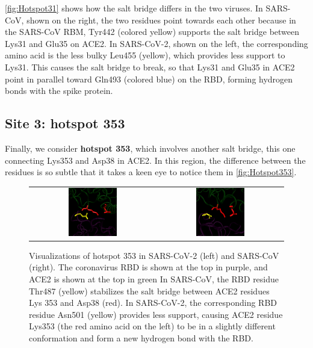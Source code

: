 \autoref{fig:Hotspot31} shows how the salt bridge differs in the two viruses. In SARS-CoV, shown on the right, the two residues point towards each other because in the SARS-CoV RBM, Tyr442 (colored yellow) supports the salt bridge between Lys31 and Glu35 on ACE2. In SARS-CoV-2, shown on the left, the corresponding amino acid is the less bulky Leu455 (yellow), which provides less support to Lys31. This causes the salt bridge to break, so that Lys31 and Glu35 in ACE2 point in parallel toward Gln493 (colored blue) on the RBD, forming hydrogen bonds with the spike protein.

\FloatBarrier
{}
\subsection{Site 3: hotspot 353}

Finally, we consider \textbf{hotspot 353}, which involves another salt bridge, this one connecting Lys353 and Asp38 in ACE2. In this region, the difference between the residues is so subtle that it takes a keen eye to notice them in \autoref{fig:Hotspot353}.\\

\begin{figure}[h]
	\centering
	\mySfFamily
	\begin{tabular}{c c}
	\includegraphics[width = 0.4\textwidth]{../images/Hotspot353_SARS-2.png} & \includegraphics[width = 0.4\textwidth]{../images/Hotspot353_SARS.png}
	\end{tabular}
	\caption{Visualizations of hotspot 353 in SARS-CoV-2 (left) and SARS-CoV (right). The coronavirus RBD is shown at the top in purple, and ACE2 is shown at the top in green In SARS-CoV, the RBD residue Thr487 (yellow) stabilizes the salt bridge between ACE2 residues Lys 353 and Asp38 (red). In SARS-CoV-2, the corresponding RBD residue Asn501 (yellow) provides less support, causing ACE2 residue Lys353 (the red amino acid on the left) to be in a slightly different conformation and form a new hydrogen bond with the RBD.}
	\label{fig:Hotspot353}
\end{figure}

